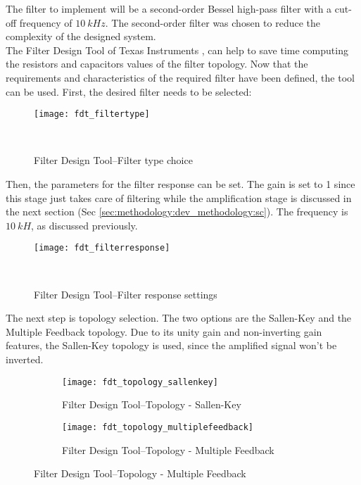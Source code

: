 The filter to implement will be a second-order Bessel high-pass filter with a cut-off frequency of $10~kHz$. The second-order filter was chosen to reduce the complexity of the designed system. \\

The Filter Design Tool of Texas Instruments \cite{fdt}, can help to save time computing the resistors and capacitors values of the filter topology. Now that the requirements and characteristics of the required filter have been defined, the tool can be used. First, the desired filter needs to be selected:

\begin{figure}[H]
    \centering
    \texttt{[image: fdt\_filtertype]}
    \caption{Filter Design Tool--Filter type choice}
~\label{fig:fdt_filtertype}
\end{figure}

Then, the parameters for the filter response can be set. The gain is set to 1 since this stage just takes care of filtering while the amplification stage is discussed in the next section (Sec \ref{sec:methodology:dev_methodology:sc}). The frequency is $10~kH$, as discussed previously.

\begin{figure}[H]
    \centering
    \texttt{[image: fdt\_filterresponse]}
    \caption{Filter Design Tool--Filter response settings}
~\label{fig:fdt_filterresponse}
\end{figure}

The next step is topology selection. The two options are the Sallen-Key and the Multiple Feedback topology. Due to its unity gain and non-inverting gain features, the Sallen-Key topology is used, since the amplified signal won't be inverted.

\begin{figure}[H]
    \centering
    \begin{subfigure}[t]{1\textwidth}
        \centering
        \texttt{[image: fdt\_topology\_sallenkey]}
        \caption{Filter Design Tool--Topology - Sallen-Key}
        \label{fig:fdt_topology:sallen-key}
    \end{subfigure}
    \begin{subfigure}[t]{1\textwidth}
        \centering
        \texttt{[image: fdt\_topology\_multiplefeedback]}
        \caption{Filter Design Tool--Topology - Multiple Feedback}
        \label{fig:fdt_topology:multiple_feedback}
    \end{subfigure}
\end{figure}


